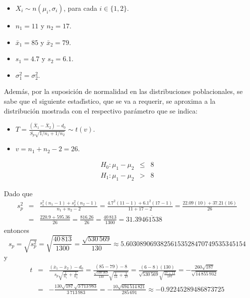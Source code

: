 \begin{solucion}
 \begin{datos}
  $\phantom{0}$
  \begin{itemize}
   \item $X_i \sim n\left( \mu_i, \sigma_i \right)$, para cada $i \in \{ 1, 2 \}$.
   \item $n_1 = 11$ y $n_2 = 17$.
   \item $\bar{x}_1 = 85$ y $\bar{x}_2 = 79$.
   \item $s_1 = 4.7$ y $s_2 = 6.1$.
   \item $\sigma_1^2 = \sigma_2^2$.
  \end{itemize}
  Adem\'as, por la suposici\'on de normalidad en las distribuciones
  poblacionales, se sabe que el siguiente estad\'{\i}stico,
  que se va a requerir,
  se aproxima a la distribuci\'on mostrada
  con el respectivo par\'ametro que se indica:
  \begin{itemize}
   \item $T = \frac{
   \left( \overline{X}_1 - \overline{X}_2 \right) - d_0
   }{
   S_p\sqrt{1/n_1 + 1/n_2}
   } \sim t(v)$.
   \item $v = n_1 + n_2 - 2 = 26$.
  \end{itemize}
 \end{datos}

 \begin{hipotesis}
  \begin{eqnarray*}
   H_0: \mu_1 - \mu_2 & \leq & 8 \\
   H_1: \mu_1 - \mu_2 & > & 8
  \end{eqnarray*}
 \end{hipotesis}

 \begin{estadistico}
  Dado que
  \begin{eqnarray*}
   s_p^2 & = & \frac{s_1^2\left( n_1 - 1 \right) + s_2^2\left( n_2 - 1 \right)}{n_1 + n_2 - 2} = \frac{4.7^2(11-1) + 6.1^2(17-1)}{11+17-2} = \frac{22.09(10) + 37.21(16)}{26} \\
   & = & \frac{220.9 + 595.36}{26} = \frac{816.26}{26} = \frac{40\,813}{1300} = 31.39\overline{461538}
  \end{eqnarray*}
  entonces
  \begin{equation*}
   s_p = \sqrt{s_p^2} = \sqrt{\frac{40\,813}{1300}} = \frac{\sqrt{530\,569}}{130} \approx 5.60308906938256153528470749535345154
  \end{equation*}
  y
  \begin{eqnarray*}
   t & = & \frac{\left( \bar{x}_1 - \bar{x}_2 \right) - d_0}{s_p\sqrt{\frac{1}{n_1} + \frac{1}{n_2}}} = \frac{(85-79) - 8}{\frac{\sqrt{530\,569}}{130}\sqrt{\frac{1}{11} + \frac{1}{17}}} = \frac{(6-8)(130)}{\sqrt{530\,569}\sqrt{\frac{17+11}{187}}} = -\frac{260\sqrt{187}}{\sqrt{14\,855\,932}} \\
   & = & - \frac{130\sqrt{187}\sqrt{3\,713\,983}}{3\,713\,983} = - \frac{10\sqrt{694\,514\,821}}{285\,691} \approx -0.92245289486873725
  \end{eqnarray*}
 \end{estadistico}


\end{solucion}
